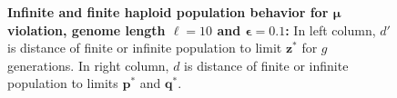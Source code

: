 \begin{figure}[h]
\begin{center}
\hspace{-3em}%
\vspace{-0.5em} \hspace{-3em}%


\caption[\textbf{Infinite and finite haploid population behavior for $\bm{\mu}$ violation, genome length $\ell = 10$ and $\bm{\epsilon} = 0.1$}]{\textbf{Infinite and finite haploid population behavior for $\bm{\mu}$ violation, genome length $\ell = 10$ and $\bm{\epsilon} = 0.1$:} 
  In left column, $d'$ is distance of finite or infinite population to limit $\bm{z}^\ast$ for $g$ generations. In right column, $d$ is distance of finite or infinite population to limits $\bm{p}^\ast$ and $\bm{q}^\ast$.}
\label{oscillation_10h_vio_mu_0.1}
\end{center}
\end{figure}

